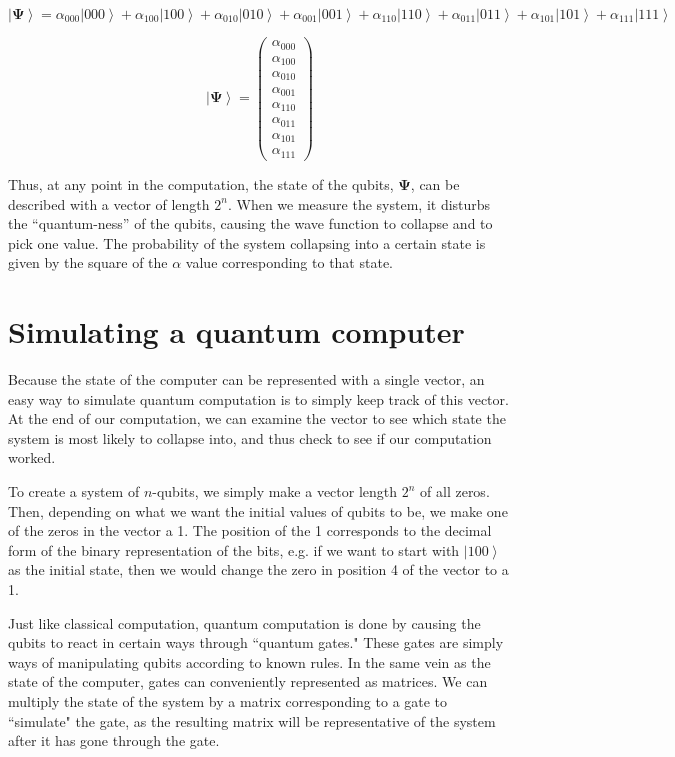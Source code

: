 \documentclass[11pt]{article}
\begin{document}
$$ \left | \mathbf{\Psi} \right \rangle=\alpha _{000}\left | 000 \right \rangle+\alpha _{100}\left | 100 \right \rangle+\alpha _{010}\left | 010 \right \rangle+\alpha _{001}\left | 001 \right 
                \rangle+\alpha _{110}\left | 110 \right \rangle+\alpha _{011}\left | 011 \right \rangle+\alpha _{101}\left | 101 \right \rangle+\alpha _{111}\left | 111 
                \right \rangle$$
                
$$\left | \mathbf{\Psi} \right \rangle=\begin{pmatrix}\alpha_{000}\\\alpha _{100}\\\alpha_{010}\\\alpha_{001}\\\alpha_{110}\\\alpha_{011}\\\alpha_{101}\\\alpha_{111}\end{pmatrix}$$

	Thus, at any point in the computation, the state of the qubits, $\mathbf{\Psi}$, can be described with a vector of length $2^{n}$. When we measure the system, it disturbs the “quantum-ness” of the qubits, causing the wave function to collapse and to pick one value. The probability of the system collapsing into a certain state is given by the square of the $\alpha$ value corresponding to that state.

\section{Simulating a quantum computer}

Because the state of the computer can be represented with a single vector, an easy way to simulate quantum computation is to simply keep track of this vector. At the end of our computation, we can examine the vector to see which state the system is most likely to collapse into, and thus check to see if our computation worked.

To create a system of $n$-qubits, we simply make a vector length $2^{n}$ of all zeros. Then, depending on what we want the initial values of qubits to be, we make one of the zeros in the vector a 1. The position of the 1 corresponds to the decimal form of the binary representation of the bits, e.g. if we want to start with $\left | 100 \right \rangle$ as the initial state, then we would change the zero in position 4 of the vector to a 1.

Just like classical computation, quantum computation is done by causing the qubits to react in certain ways through ``quantum gates." These gates are simply ways of manipulating qubits according to known rules. In the same vein as the state of the computer, gates can conveniently represented as matrices. We can multiply the state of the system by a matrix corresponding to a gate to ``simulate" the gate, as the resulting matrix will be representative of the system after it has gone through the gate.
\end{document}
